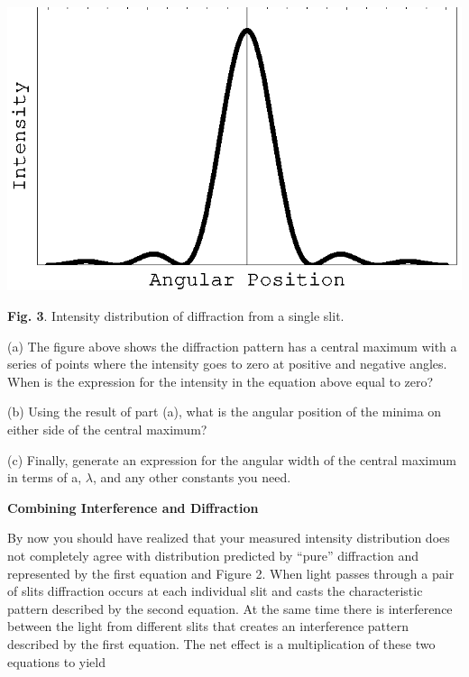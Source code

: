 \vspace{0.3cm}
{\centering \includegraphics{diffraction_of_light_fig_3.eps} \par}
\vspace{0.3cm}

{\centering \textbf{Fig. 3}. Intensity distribution of diffraction
from a single slit.\par}

(a) The figure above shows the diffraction pattern has a central maximum
with a series of points where the intensity goes to zero at positive
and negative angles. When is the expression for the intensity in the
equation above equal to zero?
\vspace{20mm}

(b) Using the result of part (a), what is the angular position of
the minima on either side of the central maximum?
\vspace{20mm}

(c) Finally, generate an expression for the angular width of the central
maximum in terms of a, \( \lambda  \), and any other constants you
need.
\vspace{30mm}

\textbf{Combining Interference and Diffraction}

By now you should have realized that your measured intensity distribution
does not completely agree with distribution predicted by {}``pure''
diffraction and represented by the first equation and Figure 2. When
light passes through a pair of slits diffraction occurs at each individual
slit and casts the characteristic pattern described by the second
equation. At the same time there is interference between the light
from different slits that creates an interference pattern described
by the first equation. The net effect is a multiplication of these
two equations to yield 

